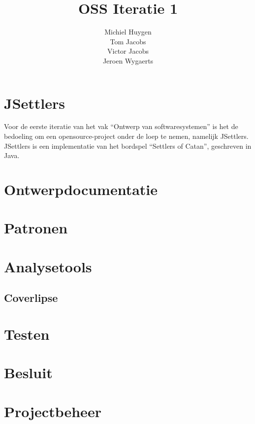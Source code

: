 \documentclass[pdftex12pt, a4paper]{article}
\begin{document}
\begin{titlepage}

\title{OSS Iteratie 1}
\author{Michiel Huygen\\Tom Jacobs\\Victor Jacobs\\Jeroen Wygaerts}

\maketitle
\thispagestyle{empty}

\end{titlepage}

\newpage

\tableofcontents

\newpage

\section*{JSettlers}


Voor de eerste iteratie van het vak ``Ontwerp van softwaresystemen'' is het de bedoeling om een opensource-project onder de loep te nemen, namelijk JSettlers. JSettlers is een implementatie van het bordspel ``Settlers of Catan'', geschreven in Java.

\newpage

\section{Ontwerpdocumentatie}

\newpage

\section{Patronen}

\newpage

\section{Analysetools}

\subsection{Coverlipse}

\newpage

\section{Testen}

\newpage

\section{Besluit}

\newpage

\section{Projectbeheer}
\end{document}
